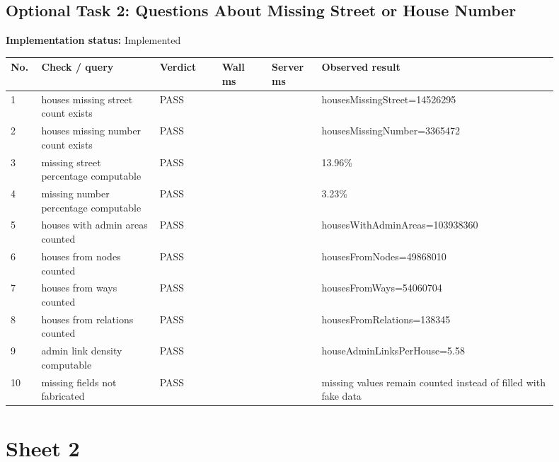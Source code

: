 \documentclass[10pt,a4paper]{article}
\begin{document}
\subsection{Optional Task 2: Questions About Missing Street or House Number}
\textbf{Implementation status:} Implemented\\
\scriptsize
\begin{longtable}{|P{0.045\linewidth}|P{0.19\linewidth}|P{0.105\linewidth}|P{0.085\linewidth}|P{0.085\linewidth}|P{0.385\linewidth}|}
\hline
\textbf{No.} & \textbf{Check / query} & \textbf{Verdict} & \textbf{Wall ms} & \textbf{Server ms} & \textbf{Observed result}\\ \hline
{} 1 & houses missing street count exists & PASS &  &  & housesMissingStreet=14526295\\ \hline
{} 2 & houses missing number count exists & PASS &  &  & housesMissingNumber=3365472\\ \hline
{} 3 & missing street percentage computable & PASS &  &  & 13.96\%\\ \hline
{} 4 & missing number percentage computable & PASS &  &  & 3.23\%\\ \hline
{} 5 & houses with admin areas counted & PASS &  &  & housesWithAdminAreas=103938360\\ \hline
{} 6 & houses from nodes counted & PASS &  &  & housesFromNodes=49868010\\ \hline
{} 7 & houses from ways counted & PASS &  &  & housesFromWays=54060704\\ \hline
{} 8 & houses from relations counted & PASS &  &  & housesFromRelations=138345\\ \hline
{} 9 & admin link density computable & PASS &  &  & houseAdminLinksPerHouse=5.58\\ \hline
{} 10 & missing fields not fabricated & PASS &  &  & missing values remain counted instead of filled with fake data\\ \hline
\end{longtable}
\normalsize
\clearpage
\section{Sheet 2}
\end{document}
